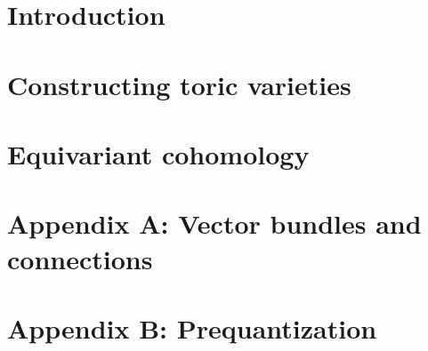 \documentclass{amsart}
\numberwithin{equation}{section}
\theoremstyle{plain} %
\theoremstyle{definition}
\theoremstyle{remark}
\begin{document}


\section{Introduction}
\section{Constructing toric varieties}

\section{Equivariant cohomology}


\section{Appendix A: Vector bundles and connections}


\section{Appendix B: Prequantization}


{}

\end{document}
